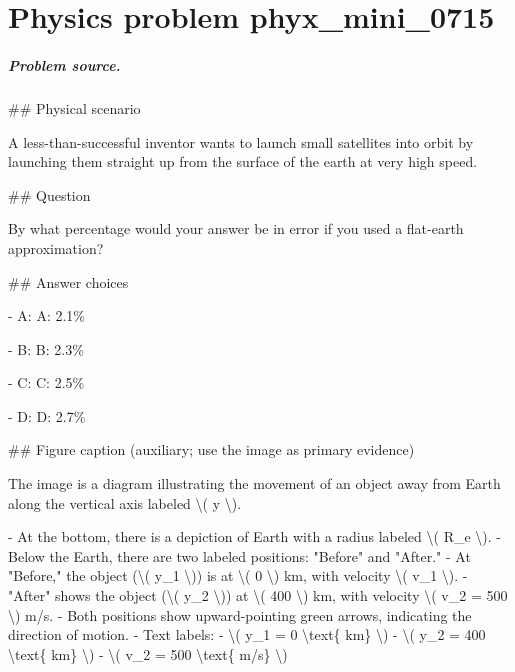 
\chapter{Physics problem phyx\_mini\_0715}
\label{ch:PhyXMiniProblems_problem_phyx_mini_0715}

\paragraph{Problem source.}
\#\# Physical scenario

A less-than-successful inventor wants to launch small satellites into orbit by launching them straight up from the surface of the earth at very high speed.

\#\# Question

By what percentage would your answer be in error if you used a flat-earth approximation?

\#\# Answer choices

- A: A: 2.1\%

- B: B: 2.3\%

- C: C: 2.5\%

- D: D: 2.7\%

\#\# Figure caption (auxiliary; use the image as primary evidence)

The image is a diagram illustrating the movement of an object away from Earth along the vertical axis labeled \textbackslash{}( y \textbackslash{}).

- At the bottom, there is a depiction of Earth with a radius labeled \textbackslash{}( R\_e \textbackslash{}).
- Below the Earth, there are two labeled positions: "Before" and "After."
- At "Before," the object (\textbackslash{}( y\_1 \textbackslash{})) is at \textbackslash{}( 0 \textbackslash{}) km, with velocity \textbackslash{}( v\_1 \textbackslash{}).
- "After" shows the object (\textbackslash{}( y\_2 \textbackslash{})) at \textbackslash{}( 400 \textbackslash{}) km, with velocity \textbackslash{}( v\_2 = 500 \textbackslash{}) m/s.
- Both positions show upward-pointing green arrows, indicating the direction of motion.
- Text labels: 
  - \textbackslash{}( y\_1 = 0 \textbackslash{}text\{ km\} \textbackslash{})
  - \textbackslash{}( y\_2 = 400 \textbackslash{}text\{ km\} \textbackslash{})
  - \textbackslash{}( v\_2 = 500 \textbackslash{}text\{ m/s\} \textbackslash{})

